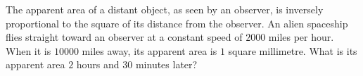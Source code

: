 The apparent area of a distant object, as seen by an observer, is inversely proportional to the square of its distance from the observer. An alien spaceship flies straight toward an observer at a constant speed of $2000$ miles per hour. When it is $10000$ miles away, its apparent area is $1$ square millimetre. What is its apparent area $2$ hours and $30$ minutes later?

